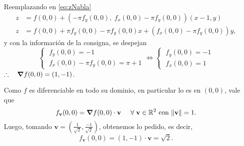 \begin{solution}
    Reemplazando en \eqref{eq:zNabla}
    \begin{align*}
        z & = f(0,0)+\left(-\pi f_y(0,0),\;f_x(0,0)-\pi f_y(0,0)\right) (x-1,y)  \\
        z & =f(0,0)   +\pi f_y(0,0)   -  \pi f_y(0,0)x+(f_x(0,0)-\pi f_y(0,0))y,
    \end{align*}
    y con la información de la consigna, se despejan
    \[\begin{cases}
            \;f_y(0,0)=-1 \\[5pt]
            \;f_x(0,0)-\pi f_y(0,0)=\pi+1
        \end{cases}
        \iff
        \begin{cases}
            \;f_y(0,0)=-1 \\[5pt]
            \;f_x(0,0)=1
        \end{cases}
    \]
    $\therefore\quad\grad f(0,0)=(1,-1)$.

    Como $f$ es diferenciable en todo su dominio, en particular lo es en $(0,0)$, vale que  $$f_{\mathbf{v}}(0,0)=\grad f(0,0)\cdot{\mathbf{v}}\;\;\;\;\;  \forall \; {\mathbf{v}} \in \mathbb{R}^{2}  \mbox{ con } \|{\mathbf{v}}\|=1. $$ Luego,  tomando  $ {\mathbf{v}} = (\frac{1}{\sqrt{2}},\frac{-1}{\sqrt{2}})$, obtenemos lo pedido, es decir,
    \[
        f_{{\mathbf{v}}} (0,0)=(1,-1)\cdot {\mathbf{v}}= \sqrt{2}.
    \]
\end{solution}

